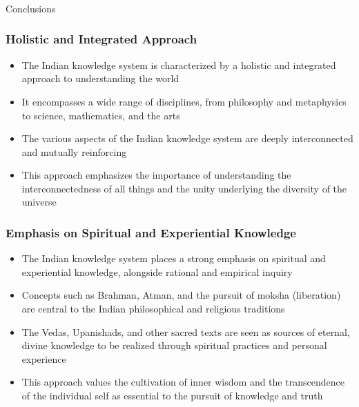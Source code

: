 \begin{frame}[fragile]\frametitle{}
\begin{center}
{\Large Conclusions}
\end{center}
\end{frame}

\begin{frame}[fragile]\frametitle{Holistic and Integrated Approach}
    \begin{itemize}
        \item The Indian knowledge system is characterized by a holistic and integrated approach to understanding the world
        \item It encompasses a wide range of disciplines, from philosophy and metaphysics to science, mathematics, and the arts
        \item The various aspects of the Indian knowledge system are deeply interconnected and mutually reinforcing
        \item This approach emphasizes the importance of understanding the interconnectedness of all things and the unity underlying the diversity of the universe
    \end{itemize}
\end{frame}

\begin{frame}[fragile]\frametitle{Emphasis on Spiritual and Experiential Knowledge}
    \begin{itemize}
        \item The Indian knowledge system places a strong emphasis on spiritual and experiential knowledge, alongside rational and empirical inquiry
        \item Concepts such as Brahman, Atman, and the pursuit of moksha (liberation) are central to the Indian philosophical and religious traditions
        \item The Vedas, Upanishads, and other sacred texts are seen as sources of eternal, divine knowledge to be realized through spiritual practices and personal experience
        \item This approach values the cultivation of inner wisdom and the transcendence of the individual self as essential to the pursuit of knowledge and truth
    \end{itemize}
\end{frame}

